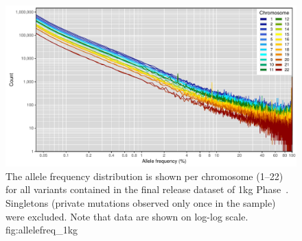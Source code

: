 

\begin{figure}[!htb]
\includegraphics[width=\textwidth]{./img/ch1/allelefreq_1kg}
{The allele frequency distribution is shown per chromosome (1--22) for all variants contained in the final release dataset of \gls{1kg} Phase~.
Singletons (private mutations observed only once in the sample) were excluded.
Note that data are shown on log-log scale.}
{fig:allelefreq_1kg}
\end{figure}

